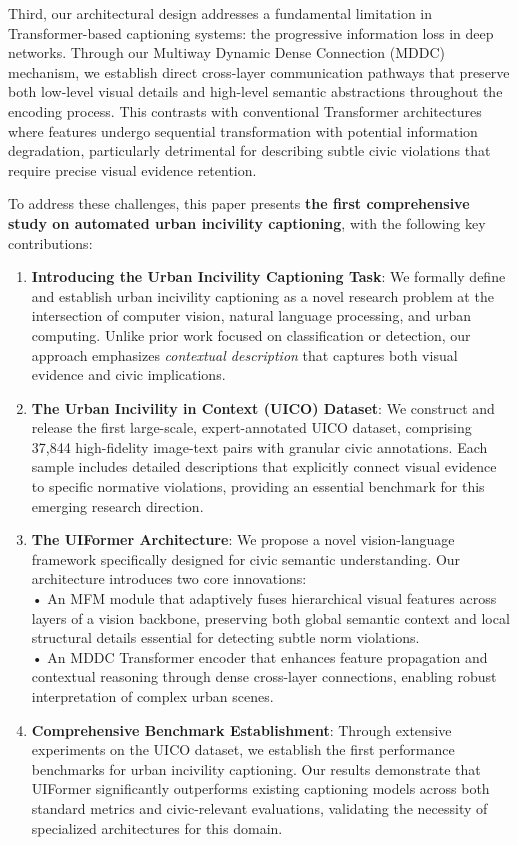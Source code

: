\documentclass[lettersize,journal]{IEEEtran}
\begin{document}
	
	
	Third, our architectural design addresses a fundamental limitation in Transformer-based captioning systems: the progressive information loss in deep networks. Through our Multiway Dynamic Dense Connection (MDDC) mechanism, we establish direct cross-layer communication pathways that preserve both low-level visual details and high-level semantic abstractions throughout the encoding process. This contrasts with conventional Transformer architectures where features undergo sequential transformation with potential information degradation, particularly detrimental for describing subtle civic violations that require precise visual evidence retention.
	
	
	To address these challenges, this paper presents \textbf{the first comprehensive study on automated urban incivility captioning}, with the following key contributions:
	
	\begin{enumerate}
		\item \textbf{Introducing the Urban Incivility Captioning Task}: We formally define and establish urban incivility captioning as a novel research problem at the intersection of computer vision, natural language processing, and urban computing. Unlike prior work focused on classification or detection, our approach emphasizes \emph{contextual description} that captures both visual evidence and civic implications.
		
		\item \textbf{The Urban Incivility in Context (UICO) Dataset}: We construct and release the first large-scale, expert-annotated UICO dataset, comprising 37,844 high-fidelity image-text pairs with granular civic annotations. Each sample includes detailed descriptions that explicitly connect visual evidence to specific normative violations, providing an essential benchmark for this emerging research direction.
		
		\item \textbf{The UIFormer Architecture}: We propose a novel vision-language framework specifically designed for civic semantic understanding. Our architecture introduces two core innovations:\\
		\quad • An MFM module that adaptively fuses hierarchical visual features across layers of a vision backbone, preserving both global semantic context and local structural details essential for detecting subtle norm violations.\\
		\quad • An MDDC Transformer encoder that enhances feature propagation and contextual reasoning through dense cross-layer connections, enabling robust interpretation of complex urban scenes.
		
		\item \textbf{Comprehensive Benchmark Establishment}: Through extensive experiments on the UICO dataset, we establish the first performance benchmarks for urban incivility captioning. Our results demonstrate that UIFormer significantly outperforms existing captioning models across both standard metrics and civic-relevant evaluations, validating the necessity of specialized architectures for this domain.
	\end{enumerate}
	
\end{document}
